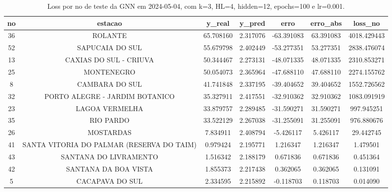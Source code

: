 \begin{table}[h]
\centering
\caption{Loss por no de teste da GNN em 2024-05-04, com k=3, HL=4, hidden=12, epochs=100 e lr=0.001.}
\label{tab:gnn_loss_k3_hl4_h12_e100_d20240504}
\begin{tabular}{ccccccc}
\toprule
no & estacao & y\_real & y\_pred & erro & erro\_abs & loss\_no \\
\midrule
36 & ROLANTE & 65.708160 & 2.317076 & -63.391083 & 63.391083 & 4018.429443 \\
52 & SAPUCAIA DO SUL & 55.679798 & 2.402449 & -53.277351 & 53.277351 & 2838.476074 \\
13 & CAXIAS DO SUL - CRIUVA & 50.344467 & 2.273131 & -48.071335 & 48.071335 & 2310.853271 \\
25 & MONTENEGRO & 50.054073 & 2.365964 & -47.688110 & 47.688110 & 2274.155762 \\
8 & CAMBARA DO SUL & 41.741848 & 2.337195 & -39.404652 & 39.404652 & 1552.726562 \\
32 & PORTO ALEGRE - JARDIM BOTANICO & 35.327911 & 2.417551 & -32.910362 & 32.910362 & 1083.091919 \\
23 & LAGOA VERMELHA & 33.879757 & 2.289485 & -31.590271 & 31.590271 & 997.945251 \\
35 & RIO PARDO & 33.522129 & 2.267038 & -31.255091 & 31.255091 & 976.880676 \\
26 & MOSTARDAS & 7.834911 & 2.408794 & -5.426117 & 5.426117 & 29.442745 \\
41 & SANTA VITORIA DO PALMAR (RESERVA DO TAIM) & 0.979424 & 2.195771 & 1.216347 & 1.216347 & 1.479501 \\
43 & SANTANA DO LIVRAMENTO & 1.516342 & 2.188179 & 0.671836 & 0.671836 & 0.451364 \\
42 & SANTANA DA BOA VISTA & 1.855373 & 2.217438 & 0.362065 & 0.362065 & 0.131091 \\
5 & CACAPAVA DO SUL & 2.334595 & 2.215892 & -0.118703 & 0.118703 & 0.014090 \\
\bottomrule
\end{tabular}
\end{table}
